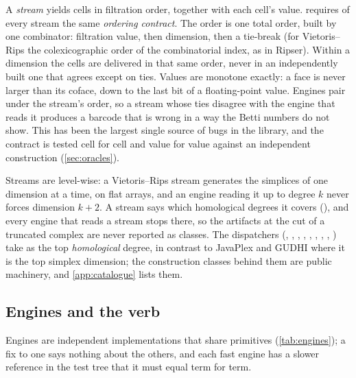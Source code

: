 A \emph{stream} yields cells in filtration order, together with each cell's value. \tdaj{} requires of every stream the
same \emph{ordering contract}. The order is one total order, built by one combinator: filtration value, then dimension, then
a tie-break (for Vietoris--Rips the colexicographic order of the combinatorial index, as in Ripser). Within a dimension the
cells are delivered in that same order, never in an independently built one that agrees except on ties. Values are monotone
exactly: a face is never larger than its coface, down to the last bit of a floating-point value. Engines pair under the
stream's order, so a stream whose ties disagree with the engine that reads it produces a barcode that is wrong in a way the
Betti numbers do not show. This has been the largest single source of bugs in the library, and the contract is tested cell
for cell and value for value against an independent construction (\cref{sec:oracles}).

Streams are level-wise: a Vietoris--Rips stream generates the simplices of one dimension at a time, on flat arrays, and
an engine reading it up to degree $k$ never forces dimension $k+2$. A stream says which homological degrees it covers
(), and every engine that reads a stream stops there, so the artifacts at the cut of a truncated
complex are never reported as classes. The dispatchers (, , ,
, , , , , ) take  as the top
\emph{homological} degree, in contrast to JavaPlex and GUDHI where it is the top simplex dimension; the construction classes
behind them are public machinery, and \cref{app:catalogue} lists them.

\subsection{Engines and the verb}\label{sec:verb}

Engines are independent implementations that share  primitives (\cref{tab:engines}); a fix to one says nothing about
the others, and each fast engine has a slower reference in the test tree that it must equal term for term.

